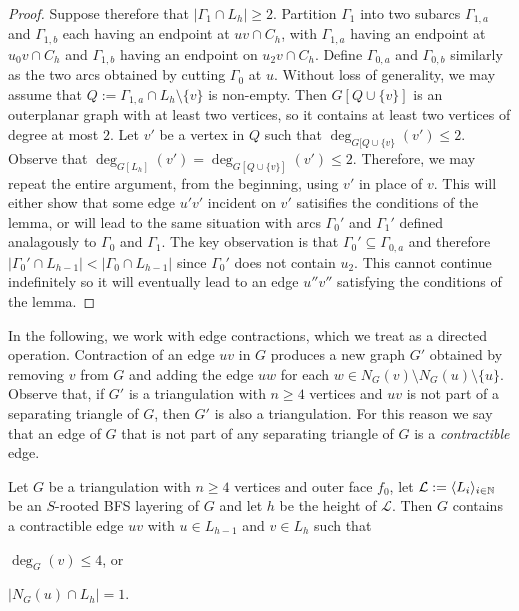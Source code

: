 \documentclass{patmorin}
\begin{document}
\begin{proof}
  Suppose therefore that $|\Gamma_1\cap L_h|\ge 2$.  Partition $\Gamma_1$ into two subarcs $\Gamma_{1,a}$ and $\Gamma_{1,b}$ each having an endpoint at $uv\cap C_h$, with $\Gamma_{1,a}$ having an endpoint at $u_0v\cap C_h$ and $\Gamma_{1,b}$ having an endpoint on $u_2v\cap C_h$.   Define $\Gamma_{0,a}$ and $\Gamma_{0,b}$ similarly as the two arcs obtained by cutting $\Gamma_0$ at $u$.  Without loss of generality, we may assume that $Q:=\Gamma_{1,a}\cap L_h\setminus\{v\}$ is non-empty.  Then $G[Q\cup\{v\}]$ is an outerplanar graph with at least two vertices, so it contains at least two vertices of degree at most $2$.  Let $v'$ be a vertex in $Q$ such that $\deg_{G[Q\cup\{v\}}(v')\le 2$.  Observe that $\deg_{G[L_h]}(v')=\deg_{G[Q\cup\{v\}]}(v')\le 2$.  Therefore, we may repeat the entire argument, from the beginning, using $v'$ in place of $v$.  This will either show that some edge $u'v'$ incident on $v'$ satisifies the conditions of the lemma, or will lead to the same situation with arcs $\Gamma_0'$ and $\Gamma_1'$ defined analagously to $\Gamma_0$ and $\Gamma_1$.  The key observation is that $\Gamma_0'\subseteq\Gamma_{0,a}$ and therefore $|\Gamma_0'\cap L_{h-1}| < |\Gamma_0\cap L_{h-1}|$ since $\Gamma_0'$ does not contain $u_2$.  This cannot continue indefinitely so it will eventually lead to an edge $u''v''$ satisfying the conditions of the lemma.
\end{proof}


In the following, we work with edge contractions, which we treat as a directed operation.  Contraction of an edge $uv$ in $G$ produces a new graph $G'$ obtained by removing $v$ from $G$ and adding the edge $uw$ for each $w\in N_G(v)\setminus N_G(u)\setminus\{u\}$.  Observe that, if $G'$ is a triangulation with $n\ge 4$ vertices and $uv$ is not part of a separating triangle of $G$, then $G'$ is also a triangulation.  For this reason we say that an edge of $G$ that is not part of any separating triangle of $G$ is a \emph{contractible} edge.


\begin{cor}\label{good_edge_triangulation}
  Let $G$ be a triangulation with $n\ge 4$ vertices and outer face $f_0$, let $\mathcal{L}:=\langle L_i\rangle_{i\in\mathbb{N}}$ be an $S$-rooted BFS layering of $G$ and let $h$ be the height of $\mathcal{L}$.
  Then $G$ contains a contractible edge $uv$ with $u\in L_{h-1}$ and $v\in L_{h}$ such that
  \begin{compactenum}[(a)]
    \item $\deg_G(v)\le 4$, or
    \item $|N_G(u)\cap L_h|=1$.
  \end{compactenum}
\end{cor}
\end{document}
